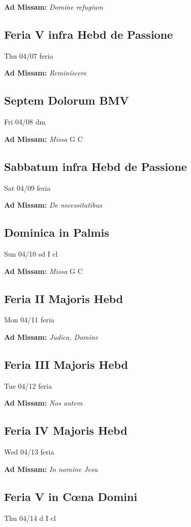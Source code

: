 \documentclass[letterpaper, 10pt, twocolumn]{article}
\begin{document}
\textbf{Ad Missam:} \textit{Domine refugium} 

\subsection*{Feria V infra Hebd de Passione}Thu 04/07 feria

\textbf{Ad Missam:} \textit{Reminíscere} 

\subsection*{Septem Dolorum BMV}Fri 04/08 dm

\textbf{Ad Missam:} \textit{Missa} G C 

\subsection*{Sabbatum infra Hebd de Passione}Sat 04/09 feria

\textbf{Ad Missam:} \textit{De necessitatibus} 

\subsection*{Dominica in Palmis}Sun 04/10 sd I cl

\textbf{Ad Missam:} \textit{Missa} G C 

\subsection*{Feria II Majoris Hebd}Mon 04/11 feria

\textbf{Ad Missam:} \textit{Judica, Domine} 

\subsection*{Feria III Majoris Hebd}Tue 04/12 feria

\textbf{Ad Missam:} \textit{Nos autem} 

\subsection*{Feria IV Majoris Hebd}Wed 04/13 feria

\textbf{Ad Missam:} \textit{In nomine Jesu} 

\subsection*{Feria V in Cœna Domini}Thu 04/14 d I cl
\end{document}
